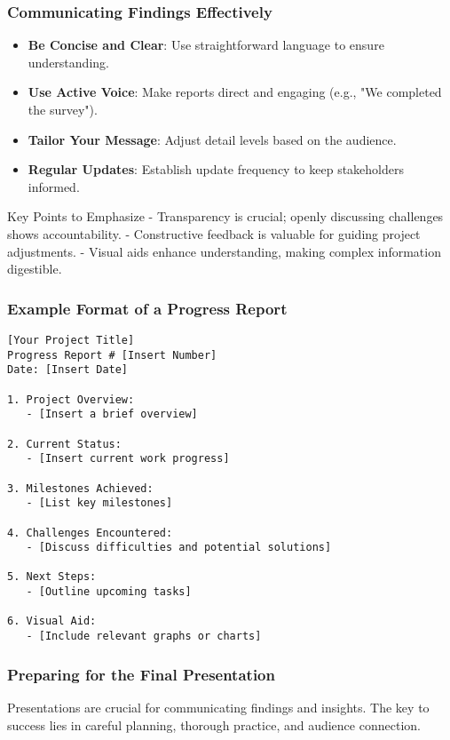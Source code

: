 \documentclass[aspectratio=169]{beamer}
\begin{document}
\begin{frame}[fragile]
    \frametitle{Communicating Findings Effectively}
    \begin{itemize}
        \item \textbf{Be Concise and Clear}: Use straightforward language to ensure understanding.
        \item \textbf{Use Active Voice}: Make reports direct and engaging (e.g., "We completed the survey").
        \item \textbf{Tailor Your Message}: Adjust detail levels based on the audience.
        \item \textbf{Regular Updates}: Establish update frequency to keep stakeholders informed.
    \end{itemize}
    
    \begin{block}{Key Points to Emphasize}
        - Transparency is crucial; openly discussing challenges shows accountability.
        - Constructive feedback is valuable for guiding project adjustments.
        - Visual aids enhance understanding, making complex information digestible.
    \end{block}
\end{frame}

\begin{frame}[fragile]
    \frametitle{Example Format of a Progress Report}
    \begin{lstlisting}
[Your Project Title]
Progress Report # [Insert Number]
Date: [Insert Date]

1. Project Overview:
   - [Insert a brief overview]

2. Current Status:
   - [Insert current work progress]

3. Milestones Achieved:
   - [List key milestones]

4. Challenges Encountered:
   - [Discuss difficulties and potential solutions]

5. Next Steps:
   - [Outline upcoming tasks]

6. Visual Aid:
   - [Include relevant graphs or charts]
    \end{lstlisting}
\end{frame}

\begin{frame}[fragile]
    \frametitle{Preparing for the Final Presentation}
    Presentations are crucial for communicating findings and insights. 
    The key to success lies in careful planning, thorough practice, and audience connection.
\end{frame}
\end{document}
